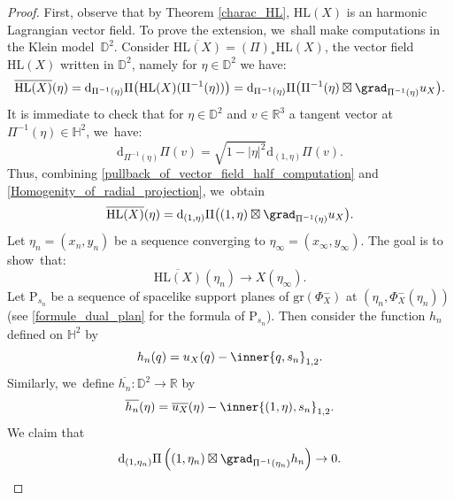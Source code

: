 \begin{proof}
First, observe that by Theorem \ref{charac_HL}, $\mathrm{HL}(X)$ is an harmonic Lagrangian vector field. To prove the extension, we~shall make computations in the Klein model~$\mathbb{D}^2$. Consider $\overline{\mathrm{HL}(X)}=(\Pi)_*\mathrm{HL}(X)$, the vector field $\mathrm{HL}(X)$ written in $\mathbb{D}^2$, namely for $\eta\in\mathbb{D}^2$ we have:
\begin{equation}\label{pullback_of_vector_field_half_computation}
\overline{\mathrm{HL}(X)}(\eta)=\mathrm{d}_{\Pi^{-1}(\eta)}\Pi\bigl(\mathrm{HL}(X)(\Pi^{-1}(\eta)) \bigr)=\mathrm{d}_{\Pi^{-1}(\eta)}\Pi\bigl(\Pi^{-1}(\eta)\boxtimes\grad_{\Pi^{-1}(\eta)} u_X \bigr).
\end{equation}
It is immediate to check that for $\eta\in \mathbb{D}^2$ and $v\in \mathbb{R}^3$ a tangent vector at $\Pi^{-1}(\eta)\in \mathbb{H}^2$, we~have:
\begin{equation}\label{Homogenity_of_radial_projection}
\mathrm{d}_{\Pi^{-1}(\eta)}\Pi(v)=\sqrt{1-\lvert\eta\rvert^2}\mathrm{d}_{(1,\eta)}\Pi(v).
\end{equation}
Thus, combining \eqref{pullback_of_vector_field_half_computation} and \eqref{Homogenity_of_radial_projection}, we~obtain
\begin{equation}\label{pullback_of_vector_field}
\overline{\mathrm{HL}(X)}(\eta)=\mathrm{d}_{(1,\eta)}\Pi\bigl((1,\eta)\boxtimes\grad_{\Pi^{-1}(\eta)} u_X \bigr).
\end{equation}
Let $\eta_n\!=\!(x_n,y_n)$ be a sequence converging to $\eta_{\infty}\!=\!(x_{\infty},y_{\infty})$. The goal is to show~that:
\begin{equation}\label{goal}
\overline{\mathrm{HL}(X)}(\eta_n)\to X(\eta_{\infty}).
\end{equation}
Let $\mathrm{P}_{s_n}$ be a sequence of spacelike support planes of $\mathrm{gr}(\Phi_X^-)$ at $(\eta_n,\Phi_X^-(\eta_n))$ (see \eqref{formule_dual_plan} for the formula of $\mathrm{P}_{s_n}$). Then consider the function $h_n$ defined on $\mathbb{H}^2$ by
\[
h_n(q)=u_X(q)-\inner{q,s_n}_{1,2}.
\]
Similarly, we~define $\overline{h_n}:\mathbb{D}^2\to\mathbb{R}$ by \begin{equation}\label{eq_h_n_positive}
\overline{h_n}(\eta)=\overline{u_X}(\eta)-\inner{(1,\eta),s_n}_{1,2}.
\end{equation} We claim that
\begin{equation}\label{claiminextension}
\mathrm{d}_{(1,\eta_n)}\Pi\left((1,\eta_n)\boxtimes\grad_{\Pi^{-1}(\eta_n)} h_n \right)\to 0.
\end{equation}

\end{proof}
